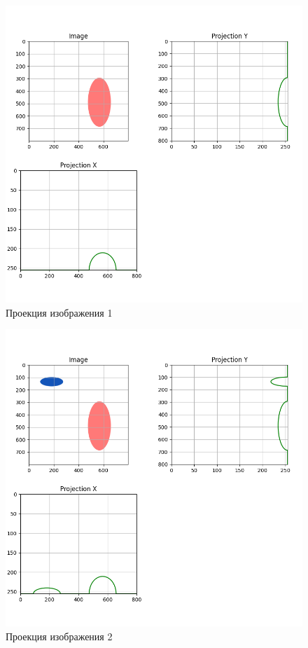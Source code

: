 \documentclass[a4paper, 12pt]{extarticle}
\begin{document}
\begin{figure}[h]
    \centering
    \includegraphics[width=\textwidth]{../results/Projection 1.png}
    \caption{Проекция изображения 1}
    \label{fig:projection1}
\end{figure}

\begin{figure}[h]
    \centering
    \includegraphics[width=\textwidth]{../results/Projection 2.png}
    \caption{Проекция изображения 2}
    \label{fig:projection2}
\end{figure}
\end{document}
